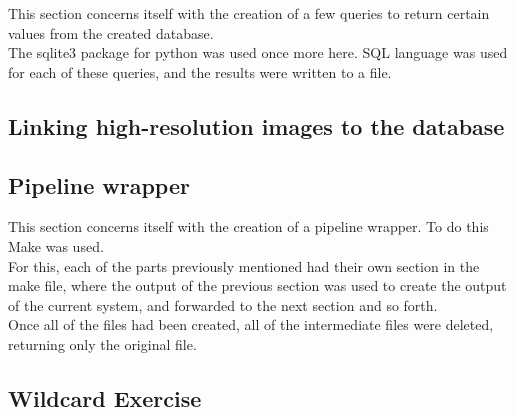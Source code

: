 \documentclass{article}
\begin{document}
This section concerns itself with the creation of a few queries to return certain values from the created database. \\

The sqlite3 package for python was used once more here. SQL language was used for each of these queries, and the results were written to a file.

\subsection*{Linking high-resolution images to the database}

\subsection*{Pipeline wrapper}

This section concerns itself with the creation of a pipeline wrapper. To do this Make was used. \\

For this, each of the parts previously mentioned had their own section in the make file, where the output of the previous section was used to create the output of the current system, and forwarded to the next section and so forth. \\

Once all of the files had been created, all of the intermediate files were deleted, returning only the original file.


\subsection*{Wildcard Exercise}
\end{document}
